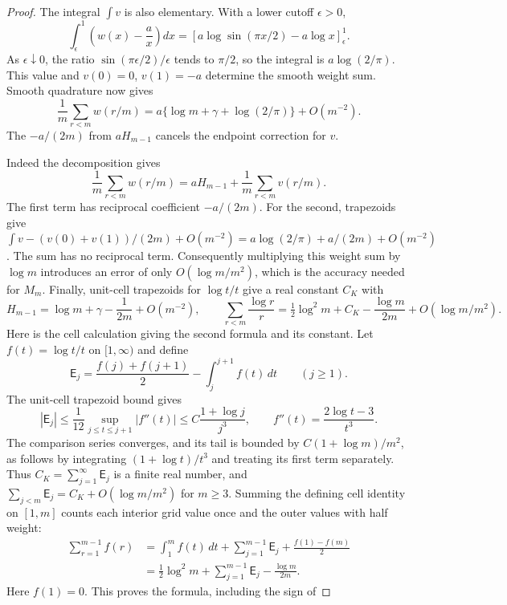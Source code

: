 \begin{proof}
The integral $\int v$ is also elementary. With a lower cutoff
$\epsilon>0$,
\[
 \int_\epsilon^1\left(w(x)-\frac ax\right)dx
 =\left[a\log\sin(\pi x/2)-a\log x\right]_\epsilon^1.
\]
As $\epsilon\downarrow0$, the ratio
$\sin(\pi\epsilon/2)/\epsilon$ tends to $\pi/2$,
so the integral is $a\log(2/\pi)$. This value and
$v(0)=0$, $v(1)=-a$ determine the smooth weight sum.
Smooth quadrature now gives
\begin{equation}\label{cu:w-sum}
 \frac1m\sum_{r<m}w(r/m)=a\{\log m+\gamma+\log(2/\pi)\}+O(m^{-2}).
\end{equation}
The $-a/(2m)$ from $aH_{m-1}$ cancels the endpoint correction for $v$.

Indeed the decomposition gives
\[
 \frac1m\sum_{r<m}w(r/m)
 =aH_{m-1}+\frac1m\sum_{r<m}v(r/m).
\]
The first term has reciprocal coefficient $-a/(2m)$.
For the second, trapezoids give
$\int v-(v(0)+v(1))/(2m)+O(m^{-2})
=a\log(2/\pi)+a/(2m)+O(m^{-2})$.
The sum has no reciprocal term. Consequently multiplying this
weight sum by $\log m$ introduces an error of only
$O(\log m/m^2)$, which is the accuracy needed for $M_m$.
Finally, unit-cell trapezoids for $\log t/t$ give a real constant $C_K$ with
\[
 H_{m-1}=\log m+\gamma-\frac1{2m}+O(m^{-2}),\qquad
 \sum_{r<m}\frac{\log r}{r}=\tfrac12\log^2m+C_K
                   -\frac{\log m}{2m}+O(\log m/m^2).
\]
Here is the cell calculation giving the second formula and its
constant. Let $f(t)=\log t/t$ on $[1,\infty)$ and define
\[
 \mathsf{E}_j=\frac{f(j)+f(j+1)}2-\int_j^{j+1}f(t)\,dt
                                      \qquad(j\geq1).
\]
The unit-cell trapezoid bound gives
\[
 |\mathsf{E}_j|\leq\frac1{12}\sup_{j\leq t\leq j+1}|f''(t)|
 \leq C\frac{1+\log j}{j^3},\qquad
 f''(t)=\frac{2\log t-3}{t^3}.
\]
The comparison series converges, and its tail is bounded by
$C(1+\log m)/m^2$, as follows by integrating
$(1+\log t)/t^3$ and treating its first term separately.
Thus $C_K=\sum_{j=1}^{\infty}\mathsf{E}_j$ is a finite real number,
and
$\sum_{j<m}\mathsf{E}_j=C_K+O(\log m/m^2)$ for $m\geq3$.
Summing the defining cell identity on $[1,m]$ counts each
interior grid value once and the outer values with half weight:
\[
 \begin{aligned}
 \sum_{r=1}^{m-1}f(r)
 &=\int_1^m f(t)\,dt+\sum_{j=1}^{m-1}\mathsf{E}_j
                                  +\frac{f(1)-f(m)}2\\
 &=\frac12\log^2m+\sum_{j=1}^{m-1}\mathsf{E}_j
                                  -\frac{\log m}{2m}.
 \end{aligned}
\]
Here $f(1)=0$. This proves the formula, including the sign of

\end{proof}
